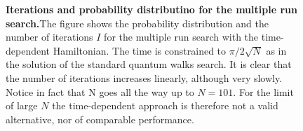 \begin{figure}[ht]
  \centering
  \caption[]{\textbf{Iterations  and probability distributino for the multiple run search.}The figure shows the probability distribution and the number of iterations $I$ for the multiple run search with the time-dependent Hamiltonian. The time is constrained to $\pi/2\sqrt{N}$ as in the solution of the standard quantum walks search. It is clear that the number of iterations increases linearly, although very slowly. Notice in fact that N goes all the way up to $N=101$. For the limit of large $N$ the time-dependent approach is therefore not a valid alternative, nor of comparable performance.}
\end{figure}
